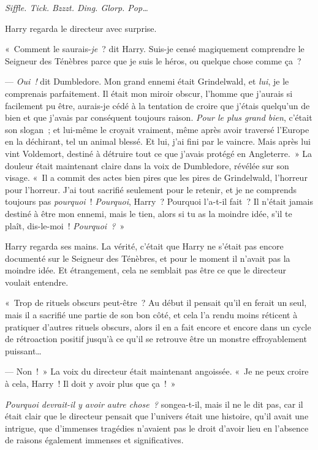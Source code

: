 \later

\emph{Siffle.
Tick. Bzzzt.
Ding. Glorp.
Pop…}

Harry regarda le directeur avec surprise.

«~Comment le saurais-\emph{je}~? dit Harry.
Suis-je censé magiquement comprendre le Seigneur des Ténèbres parce que je suis le héros, ou quelque chose comme ça~?

--- \emph{Oui~!} dit Dumbledore.
Mon grand ennemi était Grindelwald, et \emph{lui}, je le comprenais parfaitement.
Il était mon miroir obscur, l'homme que j'aurais si facilement pu être, aurais-je cédé à la tentation de croire que j'étais quelqu'un de bien et que j'avais par conséquent toujours raison.
\emph{Pour le plus grand bien}, c'était son slogan~; et lui-même le croyait vraiment, même après avoir traversé l'Europe en la déchirant, tel un animal blessé.
Et lui, j'ai fini par le vaincre.
Mais après lui vint Voldemort, destiné à détruire tout ce que j'avais protégé en Angleterre.~»
La douleur était maintenant claire dans la voix de Dumbledore, révélée sur son visage.
«~Il a commit des actes bien pires que les pires de Grindelwald, l'horreur pour l'horreur.
J'ai tout sacrifié seulement pour le retenir, et je ne comprends toujours pas \emph{pourquoi}~!
\emph{Pourquoi}, Harry~?
Pourquoi l'a-t-il fait~?
Il n'était jamais destiné à être mon ennemi, mais le tien, alors si tu as la moindre idée, s'il te plaît, dis-le-moi~!
\emph{Pourquoi~?}~»

Harry regarda ses mains.
La vérité, c'était que Harry ne s'était pas encore documenté sur le Seigneur des Ténèbres, et pour le moment il n'avait pas la moindre idée.
Et étrangement, cela ne semblait pas être ce que le directeur voulait entendre.

«~Trop de rituels obscurs peut-être~?
Au début il pensait qu'il en ferait un seul, mais il a sacrifié une partie de son bon côté, et cela l'a rendu moins réticent à pratiquer d'autres rituels obscurs, alors il en a fait encore et encore dans un cycle de rétroaction positif jusqu'à ce qu'il se retrouve être un monstre effroyablement puissant…

--- Non~!~»
La voix du directeur était maintenant angoissée.
«~Je ne peux croire à cela, Harry~!
Il doit y avoir plus que ça~!~»

\emph{Pourquoi devrait-il y avoir autre chose~?} songea-t-il, mais il ne le dit pas, car il était clair que le directeur pensait que l'univers était une histoire, qu'il avait une intrigue, que d'immenses tragédies n'avaient pas le droit d'avoir lieu en l'absence de raisons également immenses et significatives.

